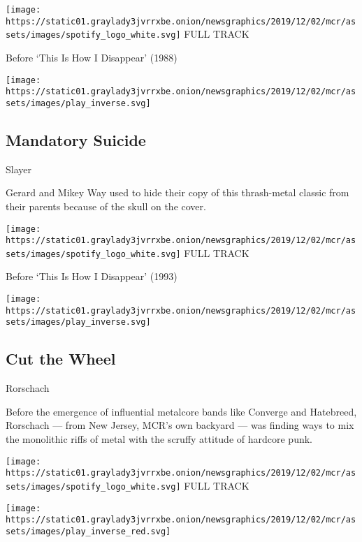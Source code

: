 \href{https://open.spotify.com/track/1LYpxJhJCMdtAAGrPnrMB0?si=T5ZDCEtHQ52M1q02rTIuqQ}{}

\texttt{[image: https://static01.graylady3jvrrxbe.onion/newsgraphics/2019/12/02/mcr/assets/images/spotify\_logo\_white.svg]}
FULL TRACK

Before `This Is How I Disappear' (1988)

\texttt{[image: https://static01.graylady3jvrrxbe.onion/newsgraphics/2019/12/02/mcr/assets/images/play\_inverse.svg]}

\hypertarget{mandatory-suicide}{%
\subsection{Mandatory Suicide}\label{mandatory-suicide}}

Slayer

Gerard and Mikey Way used to hide their copy of this thrash-metal
classic from their parents because of the skull on the cover.

\href{https://open.spotify.com/track/54hjFPLAWMurvAqlh0fifV?si=NN1-oTdnR5y5n-QgXifKgQ}{}

\texttt{[image: https://static01.graylady3jvrrxbe.onion/newsgraphics/2019/12/02/mcr/assets/images/spotify\_logo\_white.svg]}
FULL TRACK

Before `This Is How I Disappear' (1993)

\texttt{[image: https://static01.graylady3jvrrxbe.onion/newsgraphics/2019/12/02/mcr/assets/images/play\_inverse.svg]}

\hypertarget{cut-the-wheel}{%
\subsection{Cut the Wheel}\label{cut-the-wheel}}

Rorschach

Before the emergence of influential metalcore bands like Converge and
Hatebreed, Rorschach --- from New Jersey, MCR's own backyard --- was
finding ways to mix the monolithic riffs of metal with the scruffy
attitude of hardcore punk.

\href{https://open.spotify.com/track/1KYhlQabDpGPfRr1ja6eF0?si=O6Xjy-aCT12GVCtTxaGIrA}{}

\texttt{[image: https://static01.graylady3jvrrxbe.onion/newsgraphics/2019/12/02/mcr/assets/images/spotify\_logo\_white.svg]}
FULL TRACK

\texttt{[image: https://static01.graylady3jvrrxbe.onion/newsgraphics/2019/12/02/mcr/assets/images/play\_inverse\_red.svg]}

